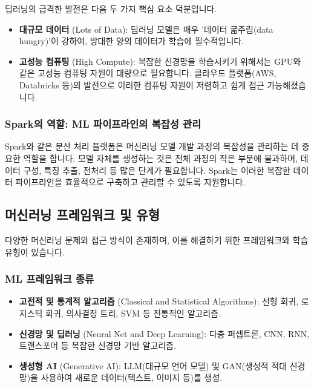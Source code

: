 \documentclass[11pt,a4paper]{article}
\theoremstyle{definition}
\begin{document}
\begin{tcolorbox}[summarybox={딥러닝의 발전 요인}]
딥러닝의 급격한 발전은 다음 두 가지 핵심 요소 덕분입니다.
\begin{itemize}
    \item \textbf{대규모 데이터} (Lots of Data): 딥러닝 모델은 매우 '데이터 굶주림(data hungry)'이 강하여, 방대한 양의 데이터가 학습에 필수적입니다.
    \item \textbf{고성능 컴퓨팅} (High Compute): 복잡한 신경망을 학습시키기 위해서는 GPU와 같은 고성능 컴퓨팅 자원이 대량으로 필요합니다. 클라우드 플랫폼(AWS, Databricks 등)의 발전으로 이러한 컴퓨팅 자원이 저렴하고 쉽게 접근 가능해졌습니다.
\end{itemize}
\end{tcolorbox}

\subsubsection*{Spark의 역할: ML 파이프라인의 복잡성 관리}
Spark와 같은 분산 처리 플랫폼은 머신러닝 모델 개발 과정의 복잡성을 관리하는 데 중요한 역할을 합니다. 모델 자체를 생성하는 것은 전체 과정의 작은 부분에 불과하며, 데이터 구성, 특징 추출, 전처리 등 많은 단계가 필요합니다. Spark는 이러한 복잡한 데이터 파이프라인을 효율적으로 구축하고 관리할 수 있도록 지원합니다.

\subsection*{머신러닝 프레임워크 및 유형}
다양한 머신러닝 문제와 접근 방식이 존재하며, 이를 해결하기 위한 프레임워크와 학습 유형이 있습니다.

\subsubsection*{ML 프레임워크 종류}
\begin{itemize}
    \item \textbf{고전적 및 통계적 알고리즘} (Classical and Statistical Algorithms): 선형 회귀, 로지스틱 회귀, 의사결정 트리, SVM 등 전통적인 알고리즘.
    \item \textbf{신경망 및 딥러닝} (Neural Net and Deep Learning): 다층 퍼셉트론, CNN, RNN, 트랜스포머 등 복잡한 신경망 기반 알고리즘.
    \item \textbf{생성형 AI} (Generative AI): LLM(대규모 언어 모델) 및 GAN(생성적 적대 신경망)을 사용하여 새로운 데이터(텍스트, 이미지 등)를 생성.
\end{itemize}
\end{document}
